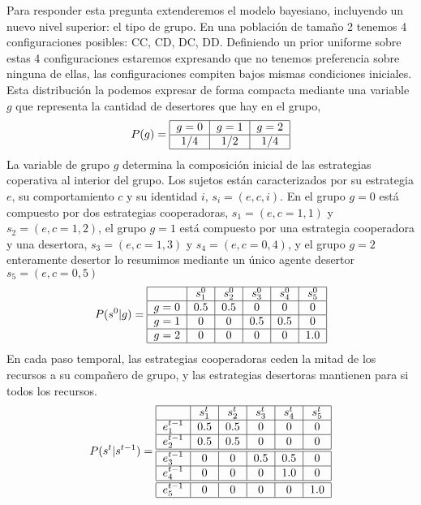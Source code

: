 \documentclass[a4paper,10pt]{article}
\begin{document}
Para responder esta pregunta extenderemos el modelo bayesiano, incluyendo un nuevo nivel superior: el tipo de grupo.
En una población de tamaño 2 tenemos 4 configuraciones posibles: CC, CD, DC, DD.
Definiendo un prior uniforme sobre estas 4 configuraciones estaremos expresando que no tenemos preferencia sobre ninguna de ellas, las configuraciones compiten bajos mismas condiciones iniciales.
Esta distribución la podemos expresar de forma compacta mediante una variable $g$ que representa la cantidad de desertores que hay en el grupo,
%
\begin{align}
\centering
P(g) = \begin{tabular}{|c|c|c|c|}
        \hline
        $g=0$ & $g=1$ & $g=2$ \\ \hline
        $1/4$ & $1/2$ & $1/4$ \\ \hline
\end{tabular}
\end{align}
%
La variable de grupo $g$ determina la composición inicial de las estrategias coperativa al interior del grupo.
Los sujetos están caracterizados por su estrategia $e$, su comportamiento $c$ y su identidad $i$, $s_i=(e,c,i)$.
En el grupo $g=0$ está compuesto por dos estrategias cooperadoras, $s_1=(e,c=1,1)$ y $s_2=(e,c=1,2)$, el grupo $g=1$ está compuesto por una estrategia cooperadora y una desertora, $s_3=(e,c=1,3)$ y $s_4=(e,c=0,4)$, y el grupo $g=2$ enteramente desertor lo resumimos mediante un único agente desertor $s_5=(e,c=0,5)$
%
\begin{align}
\centering
P(s^0|g) = \begin{tabular}{|c|c|c|c|c|c|}
        \hline
        & $s^0_1$ & $s^0_2$ & $s^0_3$ &  $s^0_4$ & $s^0_5$ \\ \hline
       $g=0$ & $0.5$ & $0.5$ & $0$ &  $0$ & $0$  \\ \hline
       $g=1$ & $0$ & $0$ & $0.5$ & $0.5$ & $0$ \\ \hline
       $g=2$ & $0$ & $0$ & $0$ & $0$ & $1.0$ \\ \hline
\end{tabular}
\end{align}
%
En cada paso temporal, las estrategias cooperadoras ceden la mitad de los recursos a su compañero de grupo, y las estrategias desertoras mantienen para si todos los recursos.
%
\begin{align}
\centering
P(s^{t}|s^{t-1}) = \begin{tabular}{|c|c|c|c|c|c|}
        \hline
        & $s^t_1$ & $s^t_2$ & $s^t_3$ & $s^t_4$ & $s^t_5$ \\ \hline
       $e^{t-1}_1$ & $0.5$ & $0.5$ & $0$ &  $0$ & $0$  \\ \hline
       $e^{t-1}_2$ & $0.5$ & $0.5$ & $0$ & $0$ & $0$  \\ \hline \hline
       $e^{t-1}_3$ & $0$ & $0$ & $0.5$ & $0.5$ & $0$  \\ \hline
       $e^{t-1}_4$ & $0$ & $0$ & $0$ & $1.0$ & $0$  \\ \hline \hline
       $e^{t-1}_5$ & $0$ & $0$ & $0$ & $0$ & $1.0$  \\ \hline
\end{tabular}
\end{align}
\end{document}
